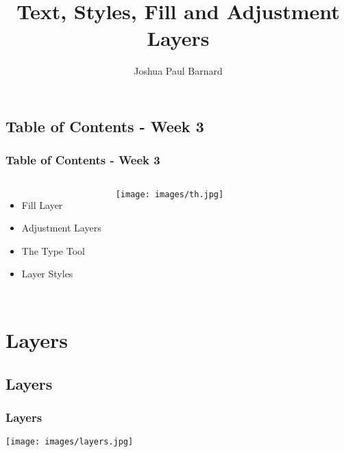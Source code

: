 \documentclass{beamer}
\title{Text, Styles, Fill and Adjustment Layers}
\author{Joshua Paul Barnard}
\date{\vspace{-5em}}
\begin{document}
	{
		\begin{frame}
			\vspace{-35pt}
			\maketitle
		\end{frame}
	}

	\section{}	
\subsection{Table of Contents - Week 3}
\begin{frame}
	\frametitle{Table of Contents - Week 3}
	\begin{columns}
		\column{.6\textwidth}
		\vspace{-25pt}
		\begin{itemize}
			\item Fill Layer
			\item Adjustment Layers
			\item The Type Tool
			\item Layer Styles
		\end{itemize}
		\column{.45\textwidth}
		\texttt{[image: images/th.jpg]}
	\end{columns}
\end{frame}


	\section{Layers}
	
			\subsection{Layers}		
	\begin{frame}
		\frametitle{Layers}
		\begin{center}
			\texttt{[image: images/layers.jpg]}
		\end{center}
	\end{frame}
	
\end{document}
